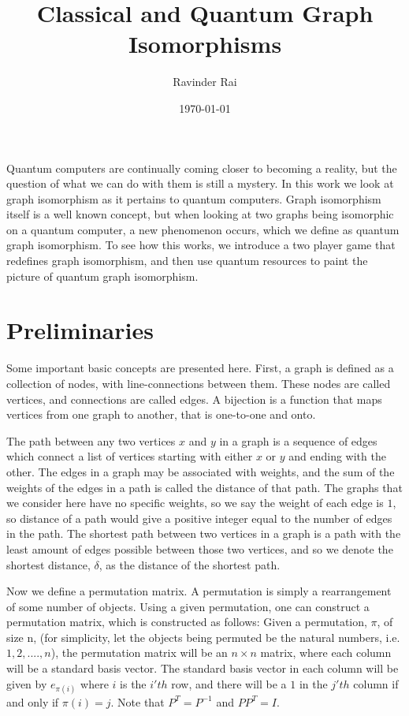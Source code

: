 \documentclass[12pt]{article}
\title{\textbf{Classical and Quantum Graph Isomorphisms}}
\author{Ravinder Rai}
\date{\today}
\theoremstyle{definition}
\begin{document}
 



\begin{titlepage}
\centering
\maketitle

Quantum computers are continually coming closer to becoming a reality, but the question of what we can do with them is still a mystery. In this work we look at graph isomorphism as it pertains to quantum computers. Graph isomorphism itself is a well known concept, but when looking at two graphs being isomorphic on a quantum computer, a new phenomenon occurs, which we define as quantum graph isomorphism. To see how this works, we introduce a two player game that redefines graph isomorphism, and then use quantum resources to paint the picture of quantum graph isomorphism. 

\end{titlepage}

\newpage
\section{Preliminaries}
Some important basic concepts are presented here. First, a graph is defined as a collection of nodes, with line-connections between them. These nodes are called vertices, and connections are called edges. A bijection is a function that maps vertices from one graph to another, that is one-to-one and onto.

The path between any two vertices $x$ and $y$ in a graph is a sequence of edges which connect a list of vertices starting with either $x$ or $y$ and ending with the other. The edges in a graph may be associated with weights, and the sum of the weights of the edges in a path is called the distance of that path. The graphs that we consider here have no specific weights, so we say the weight of each edge is $1$, so distance of a path would give a positive integer equal to the number of edges in the path. The shortest path between two vertices in a graph is a path with the least amount of edges possible between those two vertices, and so we denote the shortest distance, $\delta$, as the distance of the shortest path. 


Now we define a permutation matrix. A permutation is simply a rearrangement of some number of objects. Using a given permutation, one can construct a permutation matrix, which is constructed as follows: Given a permutation, $\pi$, of size n, (for simplicity, let the objects being permuted be the natural numbers, i.e. $1, 2, ...., n$), the permutation matrix will be an $n \times n$ matrix, where each column will be a standard basis vector. The standard basis vector in each column will be given by $e_{\pi(i)}$ where $i$ is the $i'th$ row, and there will be a $1$ in the $j'th$ column if and only if $\pi(i) = j$. Note that $P^T = P^{-1}$ and $PP^T = I$. 
\end{document}
